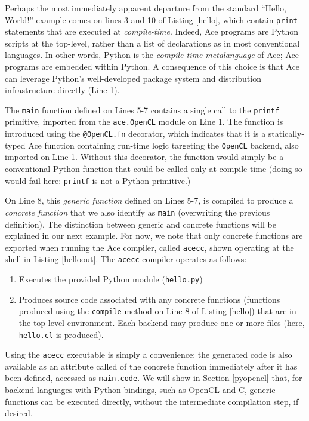 \documentclass[10pt, conference, compsocconf]{IEEEtran}
\begin{document}
Perhaps the most immediately apparent departure from the standard ``Hello, World!'' example comes on lines 3 and 10 of Listing \ref{hello}, which contain \verb|print| statements that are executed at {\em compile-time}. Indeed, Ace programs are Python scripts at the top-level, rather than a list of declarations as in most conventional languages. In other words, Python is the {\em compile-time metalanguage} of Ace; Ace programs are embedded within Python. A consequence of this choice is that Ace can leverage Python's well-developed package system and  distribution infrastructure directly (Line 1). 

The \verb|main| function defined on Lines 5-7 contains a single call to the \verb|printf| primitive, imported from the \verb|ace.OpenCL| module on Line 1. The function is introduced using the \verb|@OpenCL.fn| decorator, which indicates that it is a statically-typed Ace function containing run-time logic targeting the \verb|OpenCL| backend, also imported on Line 1. Without this decorator, the function would simply be a conventional Python function that could be called only at compile-time (doing so would fail here: \verb|printf| is not a Python primitive.)

On Line 8, this {\em generic function} defined on Lines 5-7, is compiled to produce a {\em concrete function} that we also identify as \verb|main| (overwriting the previous definition). The distinction between generic and concrete functions will be explained in our next example. For now, we note that only concrete functions are exported when running the Ace compiler, called \verb|acecc|, shown operating at the shell in Listing \ref{helloout}. The \verb|acecc| compiler operates as follows:
\begin{enumerate}
\item Executes the provided Python module (\verb|hello.py|)
\item Produces source code associated with any concrete functions (functions produced using the \verb|compile| method on Line 8 of Listing \ref{hello}) that are in the top-level environment. Each backend may produce one or more files (here, \verb|hello.cl| is produced).
\end{enumerate}

Using the \verb|acecc| executable is simply a convenience; the generated code is also available as an attribute called of the concrete function immediately after it has been defined, accessed as \verb|main.code|. We will show in Section \ref{pyopencl} that, for backend languages with Python bindings, such as OpenCL and C, generic functions can be executed directly, without the intermediate compilation step, if desired.
\end{document}
